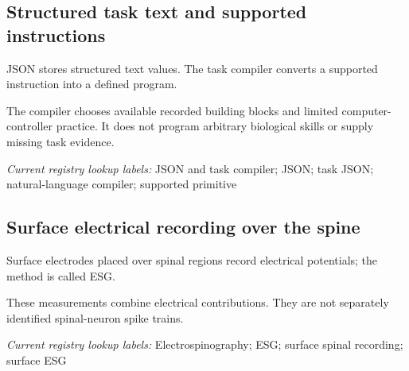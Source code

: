 \begin{samepage}
\subsection*{Structured task text and supported instructions}
\noindent JSON stores structured text values. The task compiler converts a supported instruction into a defined program.\par
\end{samepage}
\begin{samepage}
\noindent The compiler chooses available recorded building blocks and limited computer-controller practice. It does not program arbitrary biological skills or supply missing task evidence.\par\nopagebreak[4]

\end{samepage}


\noindent\textit{Current registry lookup labels:} JSON and task compiler; JSON; task JSON; natural-language compiler; supported primitive\par

\begin{samepage}
\subsection*{Surface electrical recording over the spine}
\noindent Surface electrodes placed over spinal regions record electrical potentials; the method is called ESG.\par
\end{samepage}
\begin{samepage}
\noindent These measurements combine electrical contributions. They are not separately identified spinal-neuron spike trains.\par\nopagebreak[4]

\end{samepage}


\noindent\textit{Current registry lookup labels:} Electrospinography; ESG; surface spinal recording; surface ESG\par

